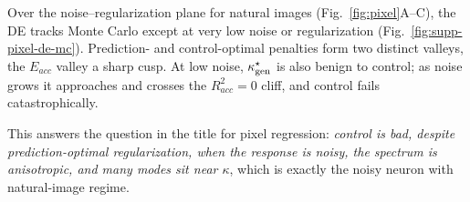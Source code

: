 
Over the noise--regularization plane for natural images (Fig.~\ref{fig:pixel}A--C), the DE tracks Monte Carlo except at very low noise or regularization (Fig.~\ref{fig:supp-pixel-de-mc}). Prediction- and control-optimal penalties form two distinct valleys, the $E_{acc}$ valley a sharp cusp. At low noise, $\kappa^\star_{\rm gen}$ is also benign to control; as noise grows it approaches and crosses the $R^2_{acc}=0$ cliff, and control fails catastrophically. %


This answers the question in the title for pixel regression: \emph{control is bad, despite prediction-optimal regularization, when the response is noisy, the spectrum is anisotropic, and many modes sit near $\kappa$}, which is exactly the noisy neuron with natural-image regime.



